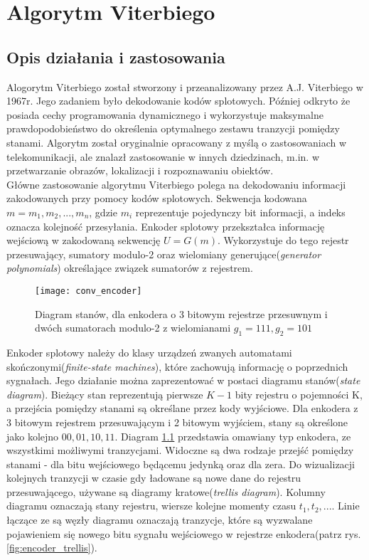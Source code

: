 \documentclass[document.tex]{subfiles}
\begin{document}
\chapter{Algorytm Viterbiego}
\section{Opis działania i zastosowania}
\indent Alogorytm Viterbiego został stworzony i przeanalizowany przez A.J. Viterbiego w 1967r. Jego zadaniem było dekodowanie kodów splotowych. Później odkryto że posiada cechy programowania dynamicznego i wykorzystuje maksymalne prawdopodobieństwo do określenia optymalnego zestawu tranzycji pomiędzy stanami. Algorytm został oryginalnie opracowany z myślą o zastosowaniach w telekomunikacji, ale znalazł zastosowanie w innych dziedzinach, m.in. w przetwarzanie obrazów, lokalizacji i rozpoznawaniu obiektów.\cite{viterbi_tutorial}
\\
\indent Główne zastosowanie algorytmu Viterbiego polega na
dekodowaniu informacji zakodowanych przy pomocy kodów splotowych. Sekwencja kodowana $m = m_1, m_2,...,m_n$, gdzie 
$m_i$ reprezentuje pojedynczy bit informacji, a indeks oznacza kolejność przesyłania. Enkoder splotowy przekształca informację wejściową w zakodowaną sekwencję $U = G(m)$.
Wykorzystuje do tego rejestr przesuwający, sumatory modulo-2 oraz wielomiany generujące(\textit{generator polynomials}) określające związek sumatorów z rejestrem.\cite{Comm_Sklar}\cite{viterbi_tutorial}

\begin{figure}[h]
\texttt{[image: conv\_encoder]}
\caption{Diagram stanów, dla enkodera o 3 bitowym rejestrze przesuwnym 
i dwóch sumatorach modulo-2 z wielomianami $g_1 = 111, g_2 = 101$ \protect\cite{Comm_Sklar}}
\label{fig:encoder}
\end{figure}
\clearpage
\indent Enkoder splotowy należy do klasy urządzeń zwanych automatami skończonymi(\textit{finite-state machines}), które zachowują informację o poprzednich sygnałach.
Jego działanie można zaprezentować w postaci diagramu stanów(\textit{state diagram}). Bieżący stan reprezentują pierwsze $K - 1$ bity rejestru o pojemności K, a przejścia pomiędzy stanami są określane przez kody wyjściowe.
Dla enkodera z 3 bitowym rejestrem przesuwającym i 2 bitowym wyjściem, stany są określone jako kolejno
$00, 01, 10, 11$. Diagram \ref{fig:encoder} przedstawia omawiany typ enkodera, ze wszystkimi możliwymi 
tranzycjami. Widoczne są dwa rodzaje przejść pomiędzy stanami - dla bitu wejściowego będącemu jedynką oraz dla zera. Do wizualizacji kolejnych tranzycji w czasie gdy ładowane są nowe dane do rejestru przesuwającego,
używane są diagramy kratowe(\textit{trellis diagram}).\cite{kody_splotowe}\cite{Comm_Sklar}\cite{viterbi_tutorial}
Kolumny diagramu oznaczają stany rejestru, wiersze kolejne momenty czasu $t_1, t_2, ...$. Linie łączące ze są węzły diagramu oznaczają tranzycje, które są wyzwalane pojawieniem się nowego bitu sygnału wejściowego w rejestrze enkodera(patrz rys. \ref{fig:encoder_trellis}).
\end{document}
